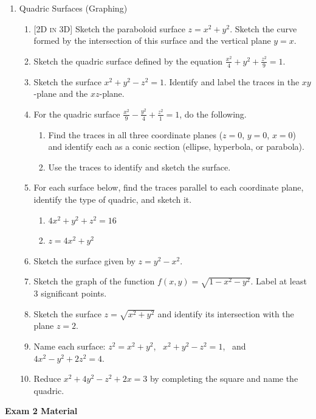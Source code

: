 \documentclass[12pt]{article}
\newcommand{\dimtag}[1]{{\footnotesize\textsc{[#1]}}\;}
\newcounter{topic}
\newcommand{\examhead}[1]{\begin{center}{\large\textbf{#1}}\end{center}}
\begin{document}
\begin{enumerate}
\item Quadric Surfaces (Graphing)
    \begin{enumerate}
        \item \dimtag{2D in 3D} Sketch the paraboloid surface $z = x^2 + y^2$. Sketch the curve formed by the intersection of this surface and the vertical plane $y=x$.
        \item Sketch the quadric surface defined by the equation $\frac{x^2}{4} + y^2 + \frac{z^2}{9} = 1$.
        \item Sketch the surface $x^2 + y^2 - z^2 = 1$. Identify and label the traces in the $xy$-plane and the $xz$-plane.
        \item For the quadric surface $\frac{x^2}{9} - \frac{y^2}{4} + \frac{z^2}{1} = 1$, do the following.
        \begin{enumerate}
            \item Find the traces in all three coordinate planes ($z=0$, $y=0$, $x=0$) and identify each as a conic section (ellipse, hyperbola, or parabola).
            \item Use the traces to identify and sketch the surface.
        \end{enumerate}
        \item For each surface below, find the traces parallel to each coordinate plane, identify the type of quadric, and sketch it.
        \begin{enumerate}
            \item $4x^2 + y^2 + z^2 = 16$
            \item $z = 4x^2 + y^2$
        \end{enumerate}
        \item Sketch the surface given by $z = y^2 - x^2$.
        \item Sketch the graph of the function $f(x,y) = \sqrt{1-x^2-y^2}$. Label at least 3 significant points.
        \item Sketch the surface $z = \sqrt{x^2 + y^2}$ and identify its intersection with the plane $z=2$.
        \item Name each surface: $z^2=x^2+y^2$, \ $x^2+y^2-z^2=1$, \ and $4x^2-y^2+2z^2=4$.
        \item Reduce $x^2+4y^2-z^2+2x=3$ by completing the square and name the quadric.
    \end{enumerate}
\newpage
\setcounter{topic}{\value{enumi}}
\end{enumerate}
\examhead{Exam 2 Material}
\end{document}
